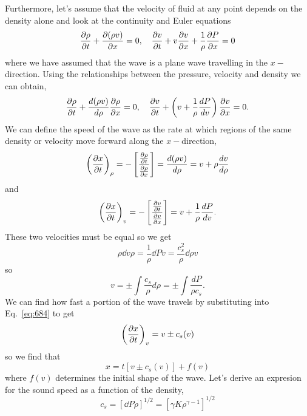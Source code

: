 {Furthermore, let's assume that the velocity of fluid at any point depends
on the density alone and look at the continuity and Euler equations
\begin{equation}
\frac{\partial {\rho}}{\partial {t}} + \frac{\partial {(\rho v)}}{\partial {x}} = 0, ~~~ \frac{\partial {v}}{\partial {t}} + v \frac{\partial {v}}{\partial {x}} +
\frac{1}{\rho} \frac{\partial {P}}{\partial {x}} = 0
\label{eq:680}
\end{equation}
where we have assumed that the wave is a plane wave travelling in the
$x-$direction.  Using the relationships between the pressure, velocity
and density we can obtain,
\begin{equation}
\frac{\partial {\rho}}{\partial {t}} + \frac{d {(\rho v)}}{d {\rho}} \frac{\partial {\rho}}{\partial {x}} = 0, ~~~ \frac{\partial {v}}{\partial {t}} +
\left ( v + \frac{1}{\rho} \frac{d {P}}{d {v}} \right ) \frac{\partial {v}}{\partial {x}} = 0.
\label{eq:681}
\end{equation}
We can define the speed of the wave as the rate at which regions of
the same density or velocity move forward along the $x-$direction,
\begin{equation}
\left( \frac{\partial {x}}{\partial {t}} \right )_\rho = - \left [
  \frac{\frac{\partial {\rho}}{\partial {t}}}{\frac{\partial {\rho}}{\partial {x}}} \right ] = \frac{d {(\rho v)}}{d {\rho}} = v
+ \rho \frac{d {v}}{d {\rho}}
\label{eq:682}
\end{equation}
and
\begin{equation}
\left( \frac{\partial {x}}{\partial {t}} \right )_v = - \left [
  \frac{\frac{\partial {v}}{\partial {t}}}{\frac{\partial {v}}{\partial {x}}} \right ] = v + \frac{1}{\rho} \frac{d {P}}{d {v}}.
\label{eq:683}
\end{equation}
These two velocities must be equal so we get
\begin{equation}
\rho \dd{v}{\rho} = \frac{1}{\rho} \dd{P}{v} = \frac{c_s^2}{\rho} \dd{\rho}{v}
\label{eq:684}
\end{equation}
so
\begin{equation}
v = \pm \int \frac{c_s}{\rho} d\rho = \pm \int \frac{dP}{\rho c_s}.
\label{eq:685}
\end{equation}
We can find how fast a portion of the wave travels by substituting
into Eq.~\ref{eq:684} to get
\begin{equation}
\left( \frac{\partial {x}}{\partial {t}} \right )_v = v \pm c_s(v)
\label{eq:686}
\end{equation}
so we find that
\begin{equation}
x = t [  v \pm c_s(v) ] + f(v)
\label{eq:687}
\end{equation}
where $f(v)$ determines the initial shape of the wave.   Let's derive
an expresion for the sound speed as a function of the density,
\begin{equation}
c_s = \left [\dd{P}{\rho}\right ]^{1/2} = \left [ \gamma K
  \rho^{\gamma-1} \right ]^{1/2}
\label{eq:688}

\end{equation}}
